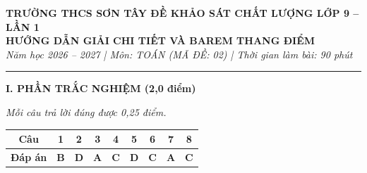 \documentclass[12pt,a4paper]{article}
\begin{document}
\begin{center}
  {\bfseries\large TRƯỜNG THCS SƠN TÂY \hfill ĐỀ KHẢO SÁT CHẤT LƯỢNG LỚP 9 -- LẦN 1}\\
  \vspace{1mm}
  {\bfseries\Large HƯỚNG DẪN GIẢI CHI TIẾT VÀ BAREM THANG ĐIỂM}\\
  \vspace{1mm}
  \textit{Năm học 2026 -- 2027 | Môn: TOÁN (MÃ ĐỀ: 02) | Thời gian làm bài: 90 phút}
\end{center}
\vspace{-1.5mm}
\hrule
\vspace{2.5mm}

\noindent\textbf{\large I. PHẦN TRẮC NGHIỆM (2,0 điểm)}

\textit{Mỗi câu trả lời đúng được 0,25 điểm.}

\begin{center}
\begin{tabular}{|c|c|c|c|c|c|c|c|c|}
\hline
\textbf{Câu} & \textbf{1} & \textbf{2} & \textbf{3} & \textbf{4} & \textbf{5} & \textbf{6} & \textbf{7} & \textbf{8} \\
\hline
\textbf{Đáp án} & \textbf{B} & \textbf{D} & \textbf{A} & \textbf{C} & \textbf{D} & \textbf{C} & \textbf{A} & \textbf{C} \\
\hline
\end{tabular}
\end{center}
\vspace{1.5mm}
\end{document}
